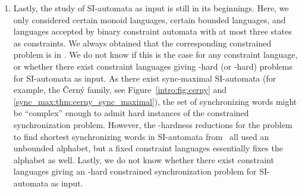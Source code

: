 \begin{enumerate}
	\item Lastly, the study of SI-automata as input is still in its beginnings. Here, 
	we only considered certain monoid languages, certain
	bounded languages, and languages accepted by binary constraint automata with at most three states
	as constraints. 
	We always obtained that the corresponding constrained 
	problem is in \NL.
	We do not know if this is the case for any constraint
	language, or whether there exist constraint languages giving \PSPACE-hard (or \NP-hard) problems for 
	SI-automata as input. As there exist sync-maximal SI-automata 
	(for example, the \v{C}ern\'y family, see Figure~\ref{intro:fig:cerny} and \cref{sync_max:thm:cerny_sync_maximal}),
    the set of synchronizing
	words might be ``complex'' enough to admit hard instances of the constrained synchronization problem.
	However, the \NP-hardness reductions for the problem to find shortest synchronizing words
	in SI-automata from~\cite{Mar2009b,DBLP:journals/corr/abs-2409-06971} 
	all used an unbounded alphabet, but a fixed constraint languages essentially fixes the
	alphabet as well.
	Lastly, we do not know whether there exist constraint languages
	giving an \NL-hard constrained synchronization problem for SI-automata as input.	
\end{enumerate}
